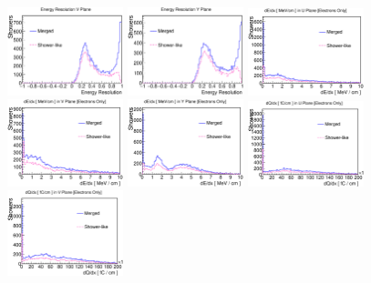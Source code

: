 \begin{figure}[htbp]
\begin{center}
\includegraphics[width=0.3\textwidth]{figs/ongoing/gamma/EnergyResV.eps}
\includegraphics[width=0.3\textwidth]{figs/ongoing/gamma/EnergyResY.eps}
\includegraphics[width=0.3\textwidth]{figs/ongoing/gamma/dEdxU.eps}
\includegraphics[width=0.3\textwidth]{figs/ongoing/gamma/dEdxV.eps}
\includegraphics[width=0.3\textwidth]{figs/ongoing/gamma/dEdxY.eps}
\includegraphics[width=0.3\textwidth]{figs/ongoing/gamma/dQdxU.eps}
\includegraphics[width=0.3\textwidth]{figs/ongoing/gamma/dQdxV.eps}

\end{center}
\end{figure}
